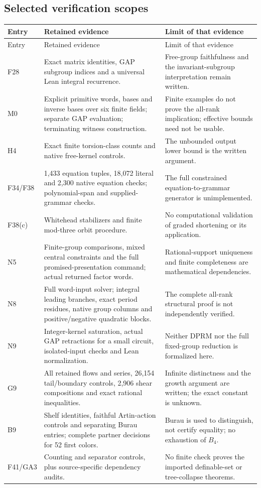 \subsection{Selected verification scopes}
\begin{longtable}{@{}P{.12\textwidth}P{.44\textwidth}P{.38\textwidth}@{}}
\toprule Entry & Retained evidence & Limit of that evidence \\\midrule
\endfirsthead\toprule Entry & Retained evidence & Limit of that evidence \\\midrule\endhead
F28 & Exact matrix identities, GAP subgroup indices and a universal Lean integral recurrence. & Free-group faithfulness and the invariant-subgroup interpretation remain written.\\[4pt]
M0 & Explicit primitive words, bases and inverse bases over six finite fields; separate GAP evaluation; terminating witness construction. & Finite examples do not prove the all-rank implication; effective bounds need not be usable.\\[4pt]
H4 & Exact finite torsion-class counts and native free-kernel controls. & The unbounded output lower bound is the written argument.\\[4pt]
F34/F38 & 1,433 equation tuples, 18,072 literal and 2,300 native equation checks; polynomial-span and supplied-grammar checks. & The full constrained equation-to-grammar generator is unimplemented.\\[4pt]
F38(c) & Whitehead stabilizers and finite mod-three orbit procedure. & No computational validation of graded shortening or its application.\\[4pt]
N5 & Finite-group comparisons, mixed central constraints and the full promised-presentation command; actual returned factor words. & Rational-support uniqueness and finite completeness are mathematical dependencies.\\[4pt]
N8 & Full word-input solver; integral leading branches, exact period residues, native group columns and positive/negative quadratic blocks. & The complete all-rank structural proof is not independently verified.\\[4pt]
N9 & Integer-kernel saturation, actual GAP retractions for a small circuit, isolated-input checks and Lean normalization. & Neither DPRM nor the full fixed-group reduction is formalized here.\\[4pt]
G9 & All retained flows and series, 26,154 tail/boundary controls, 2,906 shear compositions and exact rational inequalities. & Infinite distinctness and the growth argument are written; the exact constant is unknown.\\[4pt]
B9 & Shelf identities, faithful Artin-action controls and separating Burau entries; complete partner decisions for 52 first colors. & Burau is used to distinguish, not certify equality; no exhaustion of $B_4$.\\[4pt]
F41/GA3 & Counting and separator controls, plus source-specific dependency audits. & No finite check proves the imported definable-set or tree-collapse theorems.\\
\bottomrule
\end{longtable}

